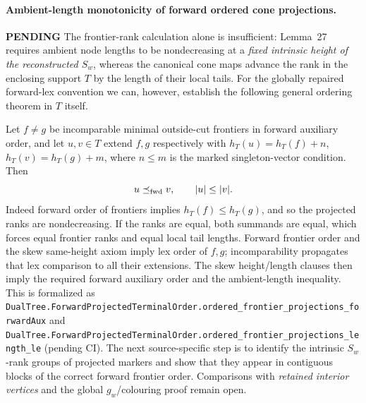 \documentclass[11pt]{article}
\newcommand{\todo}{\textcolor{gray!70!black}{\textbf{PENDING}}}
\newcommand{\lean}[1]{\texttt{#1}}
\begin{document}
\paragraph{Ambient-length monotonicity of forward ordered cone projections.} \todo
The frontier-rank calculation alone is insufficient:
Lemma~27 requires ambient node lengths to be
nondecreasing at a \emph{fixed intrinsic height
of the reconstructed $S_w$}, whereas the canonical
cone maps advance the rank in the enclosing support
$T$ by the length of their local tails.
For the globally repaired forward-lex convention
we can, however, establish the following
general ordering theorem in $T$ itself.

Let $f\ne g$ be incomparable minimal outside-cut
frontiers in forward auxiliary order, and
let $u,v\in T$ extend $f,g$ respectively with
$h_T(u)=h_T(f)+n$, $h_T(v)=h_T(g)+m$,
where $n\le m$ is the marked singleton-vector
condition. Then
\[
 u\preceq_{\rm fwd}v,\qquad |u|\le |v|.
\]
Indeed forward order of frontiers implies
$h_T(f)\le h_T(g)$, and so the projected
ranks are nondecreasing. If the ranks are
equal, both summands are equal, which forces
equal frontier ranks and equal local tail
lengths. Forward frontier order and the
skew same-height axiom imply lex order of
$f,g$; incomparability propagates that lex
comparison to all their extensions.
The skew height/length clauses then imply
the required forward auxiliary order and
the ambient-length inequality.
This is formalized as
\lean{DualTree.ForwardProjectedTerminalOrder.ordered_frontier_projections_forwardAux}
and
\lean{DualTree.ForwardProjectedTerminalOrder.ordered_frontier_projections_length_le}
(pending CI).
The next source-specific step is to identify the
intrinsic $S_w$-rank groups of projected markers
and show that they appear in contiguous blocks
of the correct forward frontier order.
Comparisons with \emph{retained interior vertices}
and the global $g_w$/colouring proof remain open.
\end{document}

